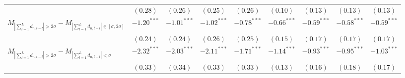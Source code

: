 \begin{tabular}{lcccccccc}
   & $(0.28)$ & $(0.26)$ & $(0.25)$ & $(0.26)$ & $(0.10)$ & $(0.13)$ & $(0.13)$ & $(0.13)$ \\ 
  $M_{\left|\sum_{l=1}^L d_{n,t-l}\right| > 2 \sigma}-M_{\left|\sum_{l=1}^L d_{n,t-l}\right| \in [\sigma, 2\sigma]}$ & $-1.20^{***}$ & $-1.01^{***}$ & $-1.02^{***}$ & $-0.78^{***}$ & $-0.66^{***}$ & $-0.59^{***}$ & $-0.58^{***}$ & $-0.59^{***}$ \\ 
   & $(0.24)$ & $(0.24)$ & $(0.26)$ & $(0.25)$ & $(0.15)$ & $(0.17)$ & $(0.17)$ & $(0.17)$ \\ 
  $M_{\left|\sum_{l=1}^L d_{n,t-l}\right| > 2 \sigma}-M_{\left|\sum_{l=1}^L d_{n,t-l}\right| < \sigma}$ & $-2.32^{***}$ & $-2.03^{***}$ & $-2.11^{***}$ & $-1.71^{***}$ & $-1.14^{***}$ & $-0.93^{***}$ & $-0.95^{***}$ & $-1.03^{***}$ \\ 
   & $(0.33)$ & $(0.34)$ & $(0.33)$ & $(0.33)$ & $(0.13)$ & $(0.16)$ & $(0.18)$ & $(0.17)$ \\ 
   \hline 
\end{tabular}
